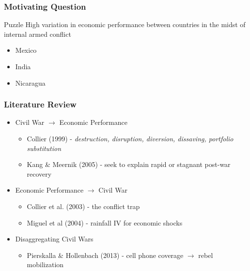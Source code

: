 \begin{frame}
\titlepage
\end{frame}

\begin{frame}
\frametitle{Motivating Question}

\begin{block}{Puzzle}
High variation in economic performance between countries in the midst of internal armed conflict
\begin{itemize}
\item Mexico
\item India
\item Nicaragua
\end{itemize}
\end{block}

\end{frame}

\begin{frame}
\frametitle{Literature Review}

\begin{itemize}
	\item Civil War $\rightarrow$ Economic Performance
	\begin{itemize}
	\item Collier (1999) - \emph{destruction, disruption, diversion, dissaving, portfolio substitution}
	\item Kang \& Meernik (2005) - seek to explain rapid or stagnant post-war recovery
	\end{itemize}
	\item Economic Performance $\rightarrow$ Civil War
	\begin{itemize}
	\item Collier et al. (2003) - the conflict trap
	\item Miguel et al (2004) - rainfall IV for economic shocks
	\end{itemize}
	\item Disaggregating Civil Wars
	\begin{itemize}
	\item Pierskalla \& Hollenbach (2013) - cell phone coverage $\rightarrow$ rebel mobilization
	\end{itemize}
\end{itemize}

\end{frame}

